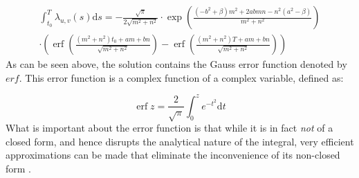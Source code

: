 \begin{align}
    \int_{t_0}^T \lambda_{u,v}(s) \mathrm{d}s
    = 
    -\frac{\sqrt{\pi}}{2 \sqrt{m^{2}+n^{2}}}
    \cdot
    \exp\left(\frac{\left(-b^{2}+\beta\right) m^{2}+2abmn-n^{2}(a^{2}-\beta)}{m^{2}+n^{2}}\right)
    \\
    \cdot 
    \left(
    \operatorname{erf}\left(\frac{\left(m^{2}+n^{2}\right)t_{0}+am+b n}{\sqrt{m^{2}+n^{2}}}\right)
    -\operatorname{erf}\left(\frac{\left(m^{2}+n^{2}\right)T+am+b n}{\sqrt{m^{2}+n^{2}}}\right)
    \right)
    \label{eq:analytical_integral}
\end{align}
As can be seen above, the solution contains the Gauss error function denoted by $erf$.
This error function is a complex function of a complex variable, defined as:

\begin{equation}
\operatorname{erf} z=\frac{2}{\sqrt{\pi}} \int_{0}^{z} e^{-t^{2}} \mathrm{d} t
\end{equation}
What is important about the error function is that while it is in fact \textit{not} of a closed form, and hence disrupts the analytical nature of the integral, very efficient approximations can be made that eliminate the inconvenience of its non-closed form \cite{Ren2007Closed-formScience}.
